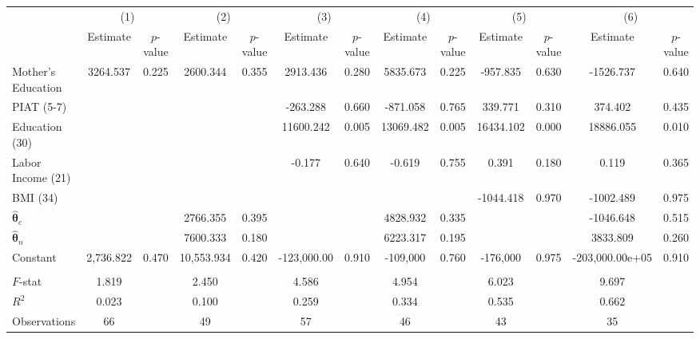 \begin{tabular}{lcccccccccccc} \toprule
 & \multicolumn{2}{c}{(1)}  &  \multicolumn{2}{c}{(2)}  &  \multicolumn{2}{c}{(3)}  &  \multicolumn{2}{c}{(4)}  & \multicolumn{2}{c}{(5)} & \multicolumn{2}{c}{(6)} \\  
 & Estimate & $p$-value & Estimate & $p$-value & Estimate & $p$-value & Estimate & $p$-value & Estimate & $p$-value & Estimate & $p$-value \\ \midrule
Mother's Education  &  3264.537 &     0.225 &  2600.344 &     0.355 &  2913.436 &     0.280 &  5835.673 &     0.225 &  -957.835 &     0.630 & -1526.737 &     0.640 \\  
PIAT (5-7) &         &         &         &         &  -263.288 &     0.660 &  -871.058 &     0.765 &   339.771 &     0.310 &   374.402 &     0.435 \\  
Education (30) &         &         &         &         & 11600.242 &     0.005 & 13069.482 &     0.005 & 16434.102 &     0.000 & 18886.055 &     0.010 \\  
Labor Income (21) &         &         &         &         &    -0.177 &     0.640 &    -0.619 &     0.755 &     0.391 &     0.180 &     0.119 &     0.365 \\  
BMI (34)  &         &         &         &         &         &         &         &         & -1044.418 &     0.970 & -1002.489 &     0.975 \\  
$\hat{\bm{\theta}}_c$ &         &         &  2766.355 &     0.395 &         &         &  4828.932 &     0.335 &         &         & -1046.648 &     0.515 \\  
$\hat{\bm{\theta}}_n$ &         &         &  7600.333 &     0.180 &         &         &  6223.317 &     0.195 &         &         &  3833.809 &     0.260 \\  
Constant &  2,736.822 &     0.470 & 10,553.934 &     0.420 & -123,000.00 &     0.910 & -109,000 &     0.760 & -176,000 &     0.975 & -203,000.00e+05 &     0.910 \\  \\ \midrule
$F$-stat &     1.819 &      &     2.450 &      &     4.586 &     &     4.954 &     &     6.023 &     &     9.697 &     \\  
$R^2$ &     0.023 &      &     0.100 &      &     0.259 &     &     0.334 &      &     0.535 &     &     0.662 &      \\  
Observations &    66 &      &    49 &      &    57 &      &    46 &    &    43 &     &    35 &    \\  
\bottomrule \end{tabular}

